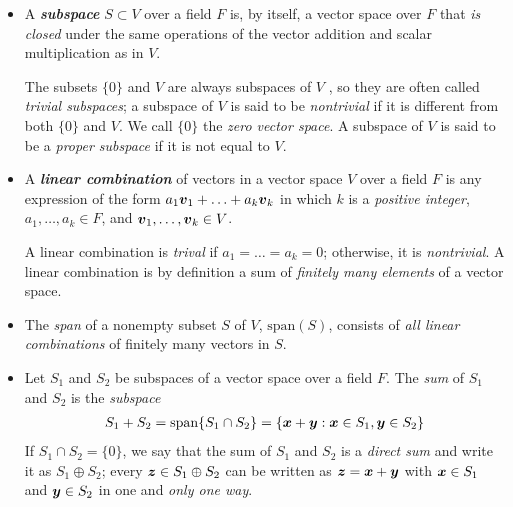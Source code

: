 \documentclass[11pt]{article}
\begin{document}
\begin{itemize}
\item A \emph{\textbf{subspace}} $S \subset V$ over a field $F$ is, by itself, a vector space over $F$ that \emph{is closed} under the same operations of the vector addition and scalar multiplication as in $V$.

The subsets $\{0\}$ and $V$ are always subspaces of $V$ , so they are often called \emph{trivial subspaces}; a subspace of $V$ is said to be \emph{nontrivial} if it is different from both $\{0\}$ and $V$. We call $\{0\}$ the \emph{zero vector space}. A subspace of $V$ is said to be a \emph{proper subspace} if it is not equal to $V$.

\item A \emph{\textbf{linear combination}} of vectors in a vector space $V$ over a field $F$ is any expression
of the form $a_1\boldsymbol{v}_1 + \ldots + a_k\boldsymbol{v}_k$ in which $k$ is a \emph{positive integer}, $a_1, \ldots, a_k \in F$, and $\boldsymbol{v}_1, \ldots, \boldsymbol{v}_k \in V$. 

A linear combination is \emph{trival} if $a_1=\ldots = a_{k} = 0$; otherwise, it is \emph{nontrivial}. A linear combination is by definition a sum of \emph{finitely many elements} of a vector space. 
\item The \emph{span} of a nonempty subset $S$ of $V$, $\text{span}(S)$, consists of \emph{all linear combinations} of finitely many vectors in $S$. 

\item Let $S_1$ and $S_2$ be subspaces of a vector space over a field $F$. The \emph{sum} of $S_1$ and $S_2$ is the \emph{subspace}
\begin{align*}
S_1 + S_2 = \text{span}\{S_1 \cap S_2\} = \{\boldsymbol{x} + \boldsymbol{y} : \boldsymbol{x} \in S_1, \boldsymbol{y} \in S_2\}
\end{align*} If $S_1 \cap S_2 = \{0\}$, we say that the sum of $S_1$ and $S_2$ is a \emph{direct sum} and write it as $S_1 \oplus S_2$; every $\boldsymbol{z} \in S_1 \oplus S_2$ can be written as  $\boldsymbol{z} = \boldsymbol{x} + \boldsymbol{y}$ with $\boldsymbol{x} \in S_1$ and $\boldsymbol{y} \in S_2$ in one and \emph{only one way}.
\end{itemize}
\end{document}
